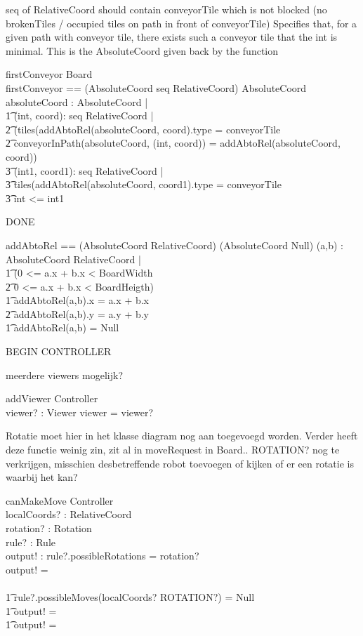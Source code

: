 \documentclass[a4paper,11pt]{article}
\begin{document}
seq of RelativeCoord should contain conveyorTile which is not blocked (no brokenTiles / occupied tiles on path in front of conveyorTile)
Specifies that, for a given path with conveyor tile, there exists such a conveyor tile that the int is minimal. This is the AbsoluteCoord given back by the function
\begin{schema}{firstConveyor}
\Xi Board \\
firstConveyor == (AbsoluteCoord \cross seq RelativeCoord) \rightarrow AbsoluteCoord
\where
\exists absoluteCoord : AbsoluteCoord |  \\ \t1
\exists (int, coord): seq RelativeCoord |  \\ \t2
(tiles(addAbtoRel(absoluteCoord, coord).type = conveyorTile \\ \t2
conveyorInPath(absoluteCoord, (int, coord)) = addAbtoRel(absoluteCoord, coord)) \implies \\ \t3
\forall (int1, coord1): seq RelativeCoord | \\ \t3
\IF tiles(addAbtoRel(absoluteCoord, coord1).type = conveyorTile \\ \t3
\THEN int <= int1
\end{schema}

DONE
\begin{axdef}
addAbtoRel == (AbsoluteCoord \cross RelativeCoord) \rightarrow (AbsoluteCoord \union Null)
\where
\forall (a,b) : AbsoluteCoord \cross RelativeCoord | \\ \t1
\IF (0 <= a.x + b.x < BoardWidth \\ \t2
0 <= a.x + b.x < BoardHeigth) \\ \t1
\THEN
addAbtoRel(a,b).x = a.x + b.x \\ \t2
addAbtoRel(a,b).y = a.y + b.y \\ \t1
\ELSE addAbtoRel(a,b) = Null
\end{axdef}


BEGIN CONTROLLER

meerdere viewers mogelijk?
\begin{schema}{addViewer}
\Delta Controller \\
viewer? : Viewer 
\where
viewer = viewer?
\end{schema}

Rotatie moet hier in het klasse diagram nog aan toegevoegd worden. Verder heeft deze functie weinig zin, zit al in moveRequest in Board.. ROTATION? nog te verkrijgen, misschien desbetreffende robot toevoegen of kijken of er een rotatie is waarbij het kan?
\begin{schema}{canMakeMove}
\Xi Controller \\
localCoords? : RelativeCoord \\
rotation? : Rotation \\
rule? : Rule \\
output! : \bool
\where
\IF rule?.possibleRotations = rotation? \\
\THEN output! = \true \\
\ELSE \\ \t1
\IF rule?.possibleMoves(localCoords? \cross ROTATION?) \not = Null \\ \t1
\THEN output! = \true \\ \t1
\ELSE output! = \false
\end{schema}
\end{document}
